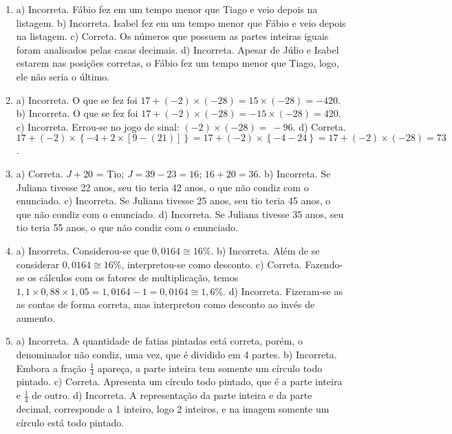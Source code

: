\begin{enumerate}
\item a) Incorreta. Fábio fez em um tempo menor que Tiago e veio depois na listagem.
b) Incorreta. Isabel fez em um tempo menor que Fábio e veio depois na listagem.
c) Correta. Os números que possuem as partes inteiras iguais foram analisados pelas casas decimais.
d) Incorreta. Apesar de Júlio e Isabel estarem nas posições corretas, o Fábio fez um tempo menor que Tiago, logo, ele não seria o último.

\item a) Incorreta. O que se fez foi
$17 + ( - 2) \times \left( - 28 \right) = 15 \times ( - 28) = - 420$.
b) Incorreta. O que se fez foi
$17 + ( - 2) \times \left( - 28 \right) = - 15 \times ( - 28) = 420$. 
c) Incorreta. Errou-se no jogo de sinal:
$( - 2) \times \left( - 28 \right) = \  - 96$.
d) Correta. 
$17 + ( - 2) \times \left\{ - 4 + 2 \times \left\lbrack 9 - \left( 21 \right) \right\rbrack \right\} = 17 + ( - 2) \times \left\{ - 4 - 24 \right\} = 17 + ( - 2) \times \left( - 28 \right) = 73$.


\item a) Correta. $J + 20$ = Tio; $J = 39 - 23 = 16$; $16 + 20 = 36$.
b) Incorreta. Se Juliana tivesse 22 anos, seu tio teria 42 anos, o que não condiz com o enunciado.
c) Incorreta. Se Juliana tivesse 25 anos, seu tio teria 45 anos, o que não condiz com o enunciado.
d) Incorreta. Se Juliana tivesse 35 anos, seu tio teria 55 anos, o que não condiz com o enunciado.


\item a) Incorreta. Considerou-se que $0,0164\cong 16\%$.
b) Incorreta. Além de se considerar $0,0164\cong 16\%$,
interpretou-se como desconto.
c) Correta. Fazendo-se os cálculos com os fatores de multiplicação,
temos $1,1 \times 0,88 \times 1,05 = 1,0164 - 1 = 0,0164\cong 1,6\%$.
d) Incorreta. Fizeram-se as as contas de forma correta, mas interpretou como desconto ao invés de aumento.

\item a) Incorreta. A quantidade de fatias pintadas está correta, porém, o denominador não condiz, uma vez, que é dividido em 4 partes.
b) Incorreta. Embora a fração $\frac{1}{4}$ apareça, a parte inteira tem somente um círculo todo pintado.
c) Correta. Apresenta um círculo todo pintado, que é a parte inteira e $\frac{1}{4}$ de outro.
d) Incorreta. A representação da parte inteira e da parte decimal, corresponde a 1 inteiro, logo 2 inteiros, e na imagem somente um círculo está todo pintado.



\end{enumerate}
